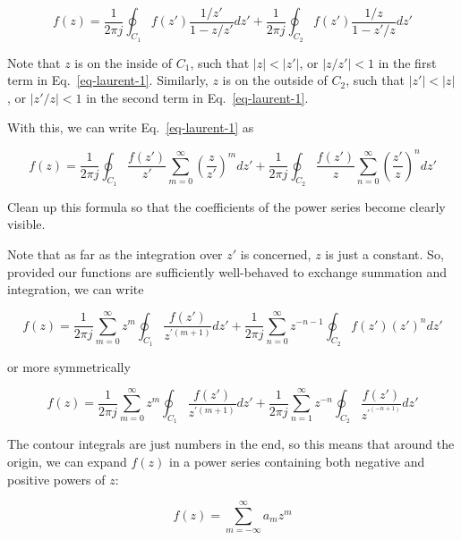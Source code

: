 \begin{equation}
f(z)=\frac{1}{2 \pi j }\oint_{{C}_1} f(z') \frac{1 / z'} {1-z / z'} dz' + \frac{1}{2 \pi j }\oint_{{C}_2} f(z') \frac{1 / z} {1 - z' / z} dz'
\label{eq-laurent-1}
\end{equation} 

Note that $z$ is on the inside of ${C}_1$, such that $| z | < |z'| $, or $ |z / z' | < 1$ in the first term in Eq.~\ref{eq-laurent-1}. Similarly, $z$ is on the outside of ${C}_2$, such that $|z'| < | z | $, or $ |z'  / z| <
1$ in the second term in Eq.~\ref{eq-laurent-1}.

With this, we can write Eq.~\ref{eq-laurent-1} as

\begin{equation}
f(z)=\frac{1}{2 \pi j }\oint_{{C}_1} \frac{f(z')}{z'} \sum_{m=0}^{\infty} \left( \frac{z}{z'}\right)^m dz' + \frac{1}{2 \pi j }\oint_{{C}_2} \frac{f(z')}{z} \sum_{n=0}^{\infty} \left(\frac{z'}{z}\right)^n dz'
\end{equation}

\begin{cue}
Clean up this formula so that the coefficients of the power series become clearly visible.
\end{cue}

Note that as far as the integration over $z'$ is concerned, $z$ is just a constant. So, provided our functions are sufficiently well-behaved to exchange summation and integration, we can write

\begin{equation}
f(z)=\frac{1}{2 \pi j } \sum_{m=0}^{\infty} z^m \oint_{{C}_1} \frac{f(z')}{z^{\prime (m+1)}} dz' + \frac{1}{2 \pi j } \sum_{n=0}^{\infty} z ^ {-n-1} \oint_{{C}_2}  {f(z')}  (z')^ n dz'
\end{equation} 

or more symmetrically

\begin{equation}
f(z)=\frac{1}{2 \pi j } \sum_{m=0}^{\infty} z^m \oint_{{C}_1} \frac{f(z')}{z^{\prime (m+1)}} dz' + \frac{1}{2 \pi j } \sum_{n=1}^{\infty} z ^ {-n} \oint_{{C}_2} \frac{f(z')}{z^{\prime^ {(-n+1)}}} dz'
\label{eq-laurent-int}
\end{equation} 

The contour integrals are just numbers in the end, so this means that around the origin, we can expand $f(z)$ in a power series containing both negative and positive powers of $z$:

\begin{equation}
f(z)= \sum_{m=-\infty}^{\infty} a_m z^m
\end{equation} 

